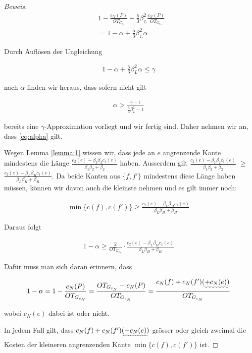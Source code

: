 \documentclass[a4paper,11pt]{scrreprt}
\begin{document}
\begin{proof}[Beweis]
\begin{align*}
& 1 - \frac{c_N(P)}{OT_{G_{c_N}}} + \frac{5}{3}\beta_L^2 \frac{c_N(P)}{OT_{G_{c_N}}}\\
&= 1 - \alpha + \frac{5}{3}\beta_L^2\alpha
\end{align*}

Durch Auflösen der Ungleichung 

\begin{align*}
1 - \alpha + \frac{5}{3}\beta_L^2\alpha \le \gamma
\end{align*}

nach $\alpha$ finden wir heraus, dass sofern nicht gilt

\begin{align}
\alpha > \frac{\gamma - 1}{\frac{5}{3}\beta_L^2 - 1}
\label{eq:alpha}
\end{align}

bereits eine $\gamma$-Approximation vorliegt und wir fertig sind. Daher nehmen wir an, dass \ref{eq:alpha} gilt.

Wegen Lemma \ref{lemma:1} wissen wir, dass jede an $e$ angrenzende Kante mindestens die Länge $\frac{c_2(e) - \beta_1\beta_2 c_1(e)}{\beta_1\beta_2 + \beta_2}$ haben. Ausserdem gilt $\frac{c_2(e) - \beta_1\beta_2 c_1(e)}{\beta_1\beta_2 + \beta_2}$ $\ge$ $\frac{c_2(e) - \beta_L\beta_H c_1(e)}{\beta_L\beta_H + \beta_H}$. Da beide Kanten aus $\{f, f'\}$ mindestens diese Länge haben müssen, können wir davon auch die kleinste nehmen und es gilt immer noch:

\begin{align*}
\min\{c(f), c(f')\} \ge \frac{c_2(e) - \beta_L\beta_H c_1(e)}{\beta_L\beta_H + \beta_H}
\end{align*}

Daraus folgt

\begin{align*}
1 - \alpha \ge \frac{2}{OT_{G_{c_N}}} \cdot \frac{c_2(e) - \beta_L\beta_H c_1(e)}{\beta_L\beta_H + \beta_H}
\end{align*}

Dafür muss man sich daran erinnern, dass

\begin{align*}
1 - \alpha = 1 - \frac{c_N(P)}{OT_{G_{c_N}}} = \frac{OT_{G_{c_N}} - c_N(P)}{OT_{G_{c_N}}} = \frac{c_N(f) + c_N(f') \uwave{(+ c_N(e))}}{OT_{G_{c_N}}}
\end{align*}

wobei $c_N(e)$ dabei ist oder nicht.

In jedem Fall gilt, dass $c_N(f) + c_N(f') \uwave{(+ c_N(e))}$ grösser oder gleich zweimal die Kosten der kleineren angrenzenden Kante $\min\{c(f), c(f')\}$ ist.


\end{proof}
\end{document}
